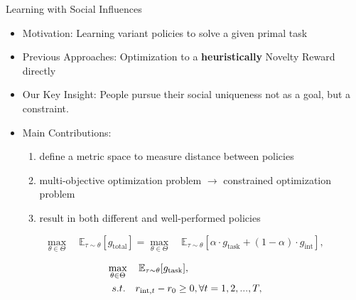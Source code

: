 \documentclass[10pt,hyperref={CJKbookmarks=true},envcountsect,mathserif]{beamer}
\begin{document}
\begin{frame}{Learning with Social Influences}

\begin{itemize}
\item Motivation: Learning variant policies to solve a given primal task
\item Previous Approaches: Optimization to a \textbf{heuristically} Novelty Reward directly
\item Our Key Insight: People pursue their social uniqueness not as a goal, but a constraint.
\item Main Contributions:
\begin{enumerate}
	\item define a metric space to measure distance between policies
	\item multi-objective optimization problem $\rightarrow$ constrained optimization problem
	\item result in both different and well-performed policies
\end{enumerate}
\end{itemize}

\begin{equation}
\max_{\theta \in \Theta} \quad\mathbb{E}_{\tau \sim {\theta}} {[g_\mathrm{total}]} = 
	\max_{\theta \in \Theta} \quad \mathbb{E}_{\tau \sim {\theta}} {[\alpha \cdot g_\mathrm{task} + (1- \alpha) \cdot g_\mathrm{int}]},
\label{multiobj}
\end{equation}

\begin{equation}
\begin{split}
&\max_{\theta\in \Theta} \quad \mathbb{E}_{\tau \sim {\theta}} {[g_\mathrm{task}]}, \\
& \begin{array}{r@{\quad}r@{}l@{\quad}l}
s.t.&r_{\mathrm{int},t} - r_0 \geq 0,\forall t=1,2,...,T, \\
\end{array}
\label{constr}
\end{split}
\end{equation}

\end{frame}
\end{document}
